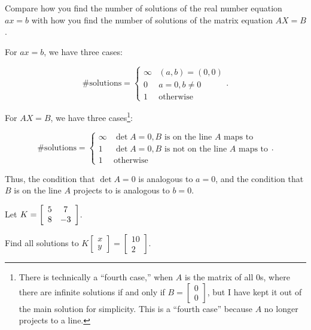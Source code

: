 \documentclass[../key.tex]{subfiles}
\begin{document}
\begin{inner_problem}
\item Compare how you find the number of solutions of the real number equation $ax=b$ with how you find the number of solutions of the matrix equation $AX=B$.
\end{inner_problem}

For $ax=b$, we have three cases:

$$\text{\# solutions} = \begin{cases} \infty & (a,b)=(0,0) \\ 0 & a=0, b\neq 0 \\ 1 & \text{otherwise} \end{cases}.$$

For $AX=B$, we have three cases\footnote{There is technically a ``fourth case,'' when $A$ is the matrix of all $0$s, where there are infinite solutions if and only if $B=\left[\begin{smallmatrix} 0 \\ 0 \end{smallmatrix}\right]$, but I have kept it out of the main solution for simplicity. This is a ``fourth case'' because $A$ no longer projects to a line.}:

$$\text{\# solutions} = \begin{cases} \infty & \det A = 0, B\text{ is on the line }A\text{ maps to} \\ 1 & \det A = 0, B\text{ is not on the line }A\text{ maps to} \\ 1 & \text{otherwise} \end{cases}.$$

Thus, the condition that $\det A = 0$ is analogous to $a=0$, and the condition that $B$ is on the line $A$ projects to is analogous to $b=0$.

\begin{outer_problem}
\item Let $K=\left[\begin{array}{cc} 5 & 7 \\ 8 & -3 \end{array}\right]$.
\end{outer_problem}

\begin{inner_problem}[start=1]
\item Find all solutions to $K\left[\begin{array}{c} x \\ y \end{array}\right]=\left[\begin{array}{c} 10 \\ 2 \end{array}\right]$.
\end{inner_problem}
\end{document}
